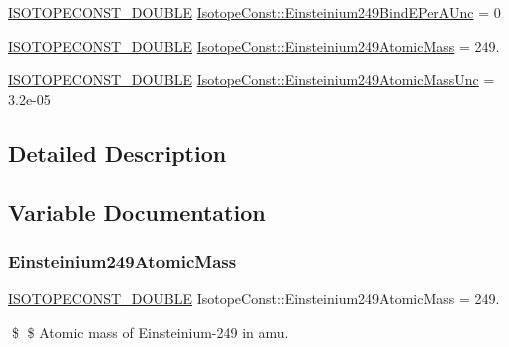\begin{DoxyCompactItemize}
\mbox{\hyperlink{group___isotope_const-_macros_ga8f45a7272ce02c0b4c65c44636ed719a}{I\+S\+O\+T\+O\+P\+E\+C\+O\+N\+S\+T\+\_\+\+D\+O\+U\+B\+LE}} \mbox{\hyperlink{group___isotope_const-_einsteinium-_es249_ga534c8991092f38765b7c600d08056372}{Isotope\+Const\+::\+Einsteinium249\+Bind\+E\+Per\+A\+Unc}} = 0
\item 
\mbox{\hyperlink{group___isotope_const-_macros_ga8f45a7272ce02c0b4c65c44636ed719a}{I\+S\+O\+T\+O\+P\+E\+C\+O\+N\+S\+T\+\_\+\+D\+O\+U\+B\+LE}} \mbox{\hyperlink{group___isotope_const-_einsteinium-_es249_gaa5d2bf57c91a98c1f21fc782cd0acfb3}{Isotope\+Const\+::\+Einsteinium249\+Atomic\+Mass}} = 249.
\item 
\mbox{\hyperlink{group___isotope_const-_macros_ga8f45a7272ce02c0b4c65c44636ed719a}{I\+S\+O\+T\+O\+P\+E\+C\+O\+N\+S\+T\+\_\+\+D\+O\+U\+B\+LE}} \mbox{\hyperlink{group___isotope_const-_einsteinium-_es249_ga70a3a8efb25ecea2422fcf479dab3e1c}{Isotope\+Const\+::\+Einsteinium249\+Atomic\+Mass\+Unc}} = 3.\+2e-\/05
\end{DoxyCompactItemize}


\subsection{Detailed Description}


\subsection{Variable Documentation}
\mbox{\label{group___isotope_const-_einsteinium-_es249_gaa5d2bf57c91a98c1f21fc782cd0acfb3}} 
\subsubsection{\texorpdfstring{Einsteinium249\+Atomic\+Mass}{Einsteinium249AtomicMass}}
{\footnotesize\ttfamily \mbox{\hyperlink{group___isotope_const-_macros_ga8f45a7272ce02c0b4c65c44636ed719a}{I\+S\+O\+T\+O\+P\+E\+C\+O\+N\+S\+T\+\_\+\+D\+O\+U\+B\+LE}} Isotope\+Const\+::\+Einsteinium249\+Atomic\+Mass = 249.}

\$ \$ Atomic mass of Einsteinium-\/249 in amu. \mbox{\label{group___isotope_const-_einsteinium-_es249_ga70a3a8efb25ecea2422fcf479dab3e1c}} 
